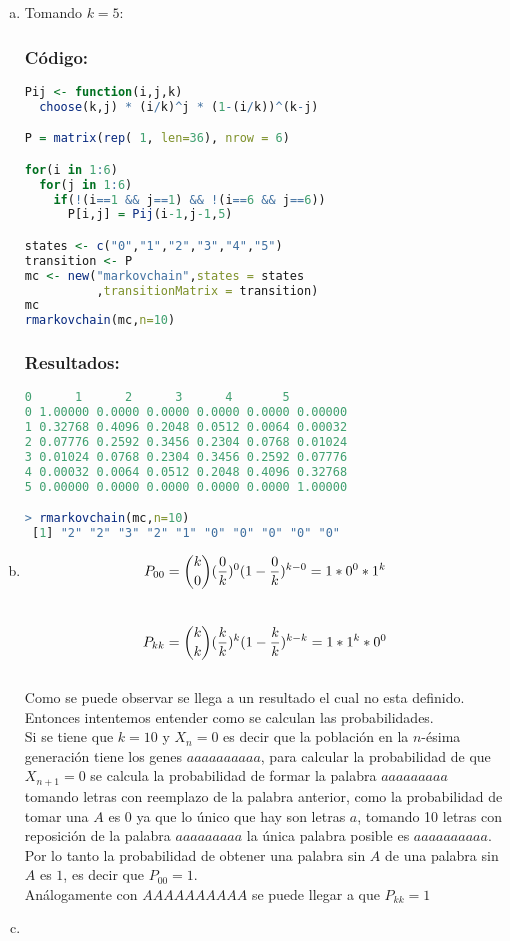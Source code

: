 \documentclass{article}
\begin{document}
\begin{enumerate}[(a)] 
\item Tomando $k = 5$:

\subsubsection*{Código:}
\begin{lstlisting}[language=R]
Pij <- function(i,j,k)
  choose(k,j) * (i/k)^j * (1-(i/k))^(k-j)

P = matrix(rep( 1, len=36), nrow = 6)

for(i in 1:6)
  for(j in 1:6)
    if(!(i==1 && j==1) && !(i==6 && j==6)) 
      P[i,j] = Pij(i-1,j-1,5)

states <- c("0","1","2","3","4","5")
transition <- P
mc <- new("markovchain",states = states
          ,transitionMatrix = transition)
mc
rmarkovchain(mc,n=10)
\end{lstlisting}

\subsubsection*{Resultados:}
\begin{lstlisting}[language=R]
        0      1      2      3      4       5
0 1.00000 0.0000 0.0000 0.0000 0.0000 0.00000
1 0.32768 0.4096 0.2048 0.0512 0.0064 0.00032
2 0.07776 0.2592 0.3456 0.2304 0.0768 0.01024
3 0.01024 0.0768 0.2304 0.3456 0.2592 0.07776
4 0.00032 0.0064 0.0512 0.2048 0.4096 0.32768
5 0.00000 0.0000 0.0000 0.0000 0.0000 1.00000

> rmarkovchain(mc,n=10)
 [1] "2" "2" "3" "2" "1" "0" "0" "0" "0" "0"
\end{lstlisting}



\item $$P_{00} = {k\choose 0}({0\over k})^0 (1-{0\over k})^{k-0} = 1 * 0^0 * 1^k $$ \\ 
$$P_{kk} = {k\choose k}({k\over k})^k (1-{k\over k})^{k-k} = 1 * 1^k * 0^0 $$\\
Como se puede observar se llega a un resultado el cual no esta definido.
Entonces intentemos entender como se calculan las probabilidades.\\
Si se tiene que $k = 10$ y $X_n = 0$ es decir que la población en la $n$-ésima generación tiene los genes $aaaaaaaaaa$, para calcular la probabilidad de que $X_{n+1} = 0$ se calcula la probabilidad de formar la palabra $aaaaaaaaa$ tomando letras con reemplazo de la palabra anterior, como la probabilidad de tomar una $A$ es 0 ya que lo único que hay son letras $a$, tomando 10 letras con reposición de la palabra $aaaaaaaaa$ la única palabra posible es $aaaaaaaaaa$. Por lo tanto la probabilidad de obtener una palabra sin $A$ de una palabra sin $A$ es $1$, es decir que $P_{00} = 1$.\\
Análogamente con $AAAAAAAAAA$ se puede llegar a que $P_{kk} = 1$
\item 

\end{enumerate}
\end{document}
